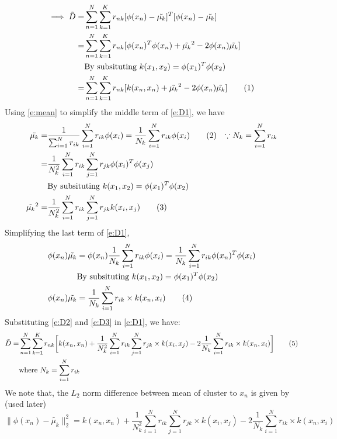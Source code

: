 \documentclass[a4paper,doc,notimes]{article}
\newcommand\numberthis{\addtocounter{equation}{1}\tag{\theequation}}
\begin{document}
\subsubsection{}
\begin{align*}
\implies \tilde{D} = & \sum_{n=1}^{N} \sum_{k=1}^{K} r_{nk} [\phi(x_n) - \tilde{\mu_k}]^T [\phi(x_n) - \tilde{\mu_k}] \\
 =& \sum_{n=1}^{N} \sum_{k=1}^{K} r_{nk} [\phi(x_n)^T\phi(x_n) + \tilde{\mu_k}^2 - 2 \phi(x_n) \tilde{\mu_k} ] \\
  & \text{By subsituting } k(x_1, x_2) = \phi(x_1)^T\phi(x_2) \\
 =& \sum_{n=1}^{N} \sum_{k=1}^{K} r_{nk} [k(x_n, x_n) + \tilde{\mu_k}^2 - 2 \phi(x_n) \tilde{\mu_k} ] \numberthis \label{e:D1} \\
\end{align*}
Using \ref{e:mean} to simplify the middle term of \ref{e:D1}, we have 
\begin{align*}
	\tilde{\mu_k} =& \frac{1}{\sum_{i=1}^{N} r_{ik}} \sum_{i=1}^{N} r_{ik} \phi(x_i) 
				 = \frac{1}{N_k} \sum_{i=1}^{N} r_{ik} \phi(x_i) \numberthis \label{e:mean2}& \space  \because N_k = \sum_{i=1}^{N} r_{ik} \\	
 =& \frac{1}{N_k^2} \sum_{i=1}^{N} r_{ik} \sum_{j=1}^{N} r_{jk} \phi(x_i)^T\phi(x_j) \\ 
 & \text{By subsituting } k(x_1, x_2) = \phi(x_1)^T\phi(x_2) \\
 \tilde{\mu_k}^2 =& \frac{1}{N_k^2} \sum_{i=1}^{N} r_{ik} \sum_{j=1}^{N} r_{jk} k(x_i, x_j) \numberthis \label{e:D2}
\end{align*}
Simplifying the last term of \ref{e:D1},
\begin{align*}
 \phi(x_n) \tilde{\mu_k} & = \phi(x_n) \frac{1}{N_k} \sum_{i=1}^{N} r_{ik} \phi(x_i) = \frac{1}{N_k} \sum_{i=1}^{N} r_{ik} \phi(x_n)^T \phi(x_i) \\
 & \text{By subsituting } k(x_1, x_2) = \phi(x_1)^T\phi(x_2) \\
\phi(x_n) \tilde{\mu_k} &= \frac{1}{N_k} \sum_{i=1}^{N} r_{ik} \times k(x_n, x_i) \numberthis \label{e:D3}
\end{align*}
Substituting \ref{e:D2} and \ref{e:D3} in \ref{e:D1}, we have:
\begin{align*}
\tilde{D} =& \sum_{n=1}^{N} \sum_{k=1}^{K} r_{nk} \bigg[k(x_n, x_n) +  \frac{1}{N_k^2} \sum_{i=1}^{N} r_{ik} \sum_{j=1}^{N} r_{jk} \times k(x_i, x_j) - 2 \frac{1}{N_k} \sum_{i=1}^{N} r_{ik} \times k(x_n, x_i) \bigg] \numberthis \label{e:D4} \\
& \text{where } N_k = \sum_{i=1}^{N} r_{ik}
\end{align*}
We note that, the $L_2$ norm difference between mean of cluster to $x_n$ is given by (used later)
\begin{equation} \label{e:D5}
 \parallel\phi(x_n) - \tilde{\mu_k} \parallel_2^2 = k(x_n, x_n) +  \frac{1}{N_k^2} \sum_{i=1}^{N} r_{ik} \sum_{j=1}^{N} r_{jk} \times k(x_i, x_j) - 2 \frac{1}{N_k} \sum_{i=1}^{N} r_{ik} \times k(x_n, x_i)
\end{equation}
\end{document}
